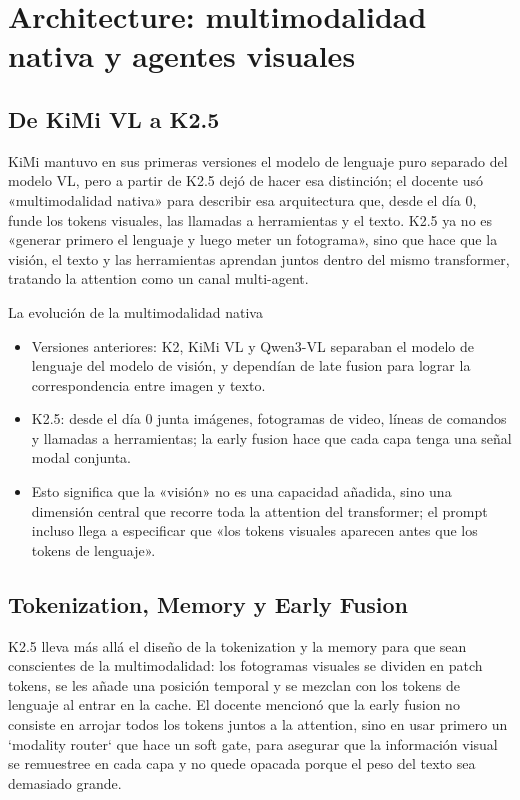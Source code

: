 \section{Architecture: multimodalidad nativa y agentes visuales}

\subsection{De KiMi VL a K2.5}
KiMi mantuvo en sus primeras versiones el modelo de lenguaje puro separado del modelo VL, pero a partir de K2.5 dejó de hacer esa distinción; el docente usó «multimodalidad nativa» para describir esa arquitectura que, desde el día 0, funde los tokens visuales, las llamadas a herramientas y el texto. K2.5 ya no es «generar primero el lenguaje y luego meter un fotograma», sino que hace que la visión, el texto y las herramientas aprendan juntos dentro del mismo transformer, tratando la attention como un canal multi-agent.

\begin{importantbox}{La evolución de la multimodalidad nativa}
\begin{itemize}
    \item Versiones anteriores: K2, KiMi VL y Qwen3-VL separaban el modelo de lenguaje del modelo de visión, y dependían de late fusion para lograr la correspondencia entre imagen y texto.
    \item K2.5: desde el día 0 junta imágenes, fotogramas de video, líneas de comandos y llamadas a herramientas; la early fusion hace que cada capa tenga una señal modal conjunta.
    \item Esto significa que la «visión» no es una capacidad añadida, sino una dimensión central que recorre toda la attention del transformer; el prompt incluso llega a especificar que «los tokens visuales aparecen antes que los tokens de lenguaje».
\end{itemize}
\end{importantbox}

\subsection{Tokenization, Memory y Early Fusion}
K2.5 lleva más allá el diseño de la tokenization y la memory para que sean conscientes de la multimodalidad: los fotogramas visuales se dividen en patch tokens, se les añade una posición temporal y se mezclan con los tokens de lenguaje al entrar en la cache. El docente mencionó que la early fusion no consiste en arrojar todos los tokens juntos a la attention, sino en usar primero un `modality router` que hace un soft gate, para asegurar que la información visual se remuestree en cada capa y no quede opacada porque el peso del texto sea demasiado grande.

